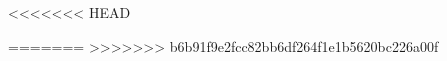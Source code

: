 \documentclass[../main.tex]{subfiles}
\begin{document}
<<<<<<< HEAD



=======
>>>>>>> b6b91f9e2fcc82bb6df264f1e1b5620bc226a00f
\end{document}
